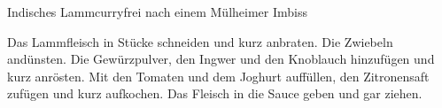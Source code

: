 \begin{recipe}{Indisches Lammcurry}{frei nach einem Mülheimer Imbiss}
  \label{Indisches Lammcurry}
  \inglist

  \steps
  Das Lammfleisch in Stücke schneiden und kurz anbraten. Die Zwiebeln andünsten. Die
  Gewürzpulver, den Ingwer und den Knoblauch hinzufügen und kurz anrösten. Mit den
  Tomaten und dem Joghurt auffüllen, den Zitronensaft zufügen und kurz aufkochen. Das
  Fleisch in die Sauce geben und gar ziehen.
\end{recipe}
